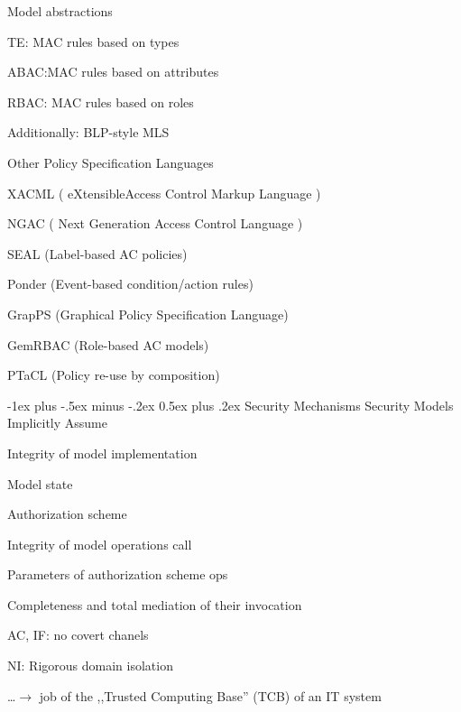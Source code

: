 \documentclass[a4paper]{article}
\makeatletter
\renewcommand{\section}{\@startsection{section}{1}{0mm}%
                {-1ex plus -.5ex minus -.2ex}%
                {0.5ex plus .2ex}%
                {\normalfont\large\bfseries}}
\makeatother
\begin{document}
\begin{multicols}{3}
    Model abstractions
    \begin{itemize*}
        \item TE: MAC rules based on types
        \item ABAC:MAC rules based on attributes
        \item RBAC: MAC rules based on roles
        \item Additionally: BLP-style MLS
    \end{itemize*}

    Other Policy Specification Languages
    \begin{itemize*}
        \item XACML ( eXtensibleAccess Control Markup Language )
        \item NGAC ( Next Generation Access Control Language )
        \item SEAL (Label-based AC policies)
        \item Ponder (Event-based condition/action rules)
        \item GrapPS (Graphical Policy Specification Language)
        \item GemRBAC (Role-based AC models)
        \item PTaCL (Policy re-use by composition)
    \end{itemize*}

    \section{Security Mechanisms}
    Security Models Implicitly Assume
    \begin{itemize*}
        \item Integrity of model implementation
        \begin{itemize*}
            \item Model state
            \item Authorization scheme
        \end{itemize*}
        \item Integrity of model operations call
        \begin{itemize*}
            \item Parameters of authorization scheme ops
            \item Completeness and total mediation of their invocation
        \end{itemize*}
        \item AC, IF: no covert chanels
        \item NI: Rigorous domain isolation
        \item \dots  $\rightarrow$ job of the ,,Trusted Computing Base'' (TCB) of an IT system
    \end{itemize*}


\end{multicols}
\end{document}
